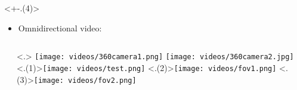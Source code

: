 \begin{frame}[c]
   \vfill
   \begin{minipage}[t][7cm][t]{\textwidth}
      \only<+-.(4)>{
         \begin{itemize}[<.->]
            \item Omnidirectional video:
         \end{itemize}
         \begin{columns}[T]
            \begin{column}{0.5\linewidth}
               \begin{independentCounter}
                  
               \end{independentCounter}
            \end{column}
            \begin{column}{0.5\linewidth}
               \only<.>{
                  \texttt{[image: videos/360camera1.png]}
                  \texttt{[image: videos/360camera2.jpg]}
                  \setcounter{tmpCounter}{\value{beamerpauses}}
               }
               \only<.(1)>{\hspace{2cm}\texttt{[image: videos/test.png]}}
               \only<.(2)>{\hspace{2cm}\texttt{[image: videos/fov1.png]}}
               \only<.(3)>{\hspace{2cm}\texttt{[image: videos/fov2.png]}}
            \end{column}
         \end{columns}
      }
    \end{minipage}
    \vfill
\end{frame}

